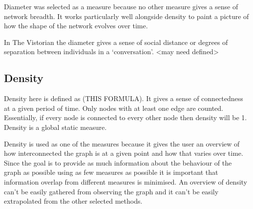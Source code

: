 Diameter was selected as a measure because no other measure gives a sense of network breadth. It works particularly well alongside density to paint a picture of how the shape of the network evolves over time.

In The Vistorian the diameter gives a sense of social distance or degrees of separation between individuals in a ‘conversation’. <may need defined> 

\subsection{Density}
Density here is defined as (THIS FORMULA). It gives a sense of connectedness at a given period of time. Only nodes with at least one edge are counted. Essentially, if every node is connected to every other node then density will be 1. Density is a global static measure.

Density is used as one of the measures because it gives the user an overview of how interconnected the graph is at a given point and how that varies over time. Since the goal is to provide as much information about the behaviour of the graph as possible using as few measures as possible it is important that information overlap from different measures is minimised. An overview of density can't be easily gathered from observing the graph and it can't be easily extrapolated from the other selected methods.

